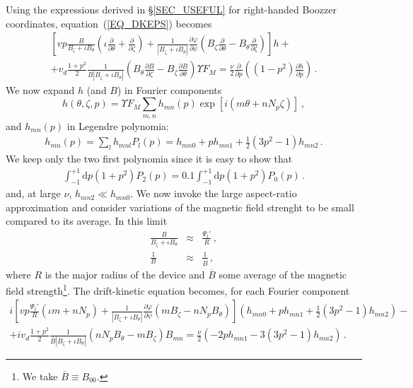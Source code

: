 Using the expressions derived in \S\ref{SEC_USEFUL} for right-handed Boozzer coordinates, equation~(\ref{EQ_DKEPS})  becomes
\begin{eqnarray}
 \left[vp\frac{B}{B_\zeta+\iota B_\theta}\left(\iota\frac{\partial}{\partial \theta}+\frac{\partial}{\partial \zeta}\right)+ \frac{1}{|B_\zeta+\iota B_\theta|}\frac{\partial \varphi}{\partial\psi}\left(B_\zeta\frac{\partial}{\partial \theta}-B_\theta\frac{\partial}{\partial \zeta}\right)\right]  h +\nonumber\\ +v_d\frac{1+p^2}{2}\frac{1}{B|B_\zeta+\iota B_\theta|}\left(B_\theta\frac{\partial B}{\partial \zeta}-B_\zeta\frac{\partial B}{\partial \theta}\right) \Upsilon F_M = \frac{\nu}{2}\frac{\partial}{\partial p}\left((1-p^2)\frac{\partial h}{\partial p}\right)\,.
\end{eqnarray}
We now expand $h$ (and $B$) in Fourier components
\begin{equation}
h(\theta,\zeta,p) = \Upsilon F_M \sum_{m,n} h_{mn}(p)\exp{[i(m\theta+nN_p\zeta)]}\,,
\end{equation}
and $h_{mn}(p)$ in Legendre polynomia:
\begin{eqnarray}
h_{mn}(p) = \sum_l h_{mnl} P_l(p) = h_{mn0} + p h_{mn1} + \frac{1}{2}(3p^2-1) h_{mn2}\,.
\end{eqnarray}
We keep only the two first polynomia since it is easy to show that
\begin{eqnarray}
\int_{-1}^{+1}\mathrm{d}p (1+p^2) P_2(p) = 0.1 \int_{-1}^{+1}\mathrm{d}p (1+p^2) P_0(p)\,.
\end{eqnarray}
and, at large $\nu$, $h_{mn2}\ll h_{mn0}$. We now invoke the large aspect-ratio approximation and consider variations of the magnetic field strenght to be small compared to its average. In this limit
\begin{eqnarray}
\frac{B}{B_\zeta+\iota B_\theta} &\approx& \frac{\Psi_t'}{R}\,,\nonumber\\
\frac{1}{B} &\approx& \frac{1}{\overline{B}}\,,
\end{eqnarray}
where $R$ is the major radius of the device and $\overline{B}$ some average of the magnetic field strength\footnote{We take $\overline{B}\equiv B_{00}$.}. The drift-kinetic equation becomes, for each Fourier component
\begin{eqnarray}
i\left[vp\frac{\Psi_t'}{R}(\iota m  + nN_p)+\frac{1}{|B_\zeta+\iota B_\theta|}\frac{\partial \varphi}{\partial\psi}(m B_\zeta-nN_p B_\theta)\right] \left(h_{mn0} + p h_{mn1}+ \frac{1}{2}(3p^2-1) h_{mn2}\right) -\nonumber\\ +iv_d\frac{1+p^2}{2} \frac{1}{\overline{B}|B_\zeta+\iota B_\theta|} (n N_p B_\theta - m B_\zeta) B_{mn}  = \frac{\nu}{2} \left( -2 p h_{mn1} - 3(3p^2-1) h_{mn2}\right)\,.
\end{eqnarray}
